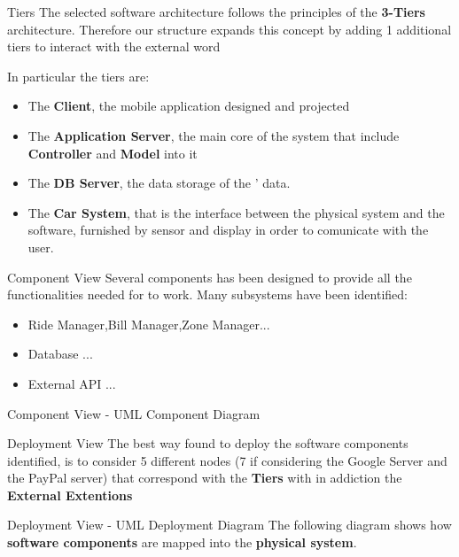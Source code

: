 \documentclass{../Common/Structure/pdf_presentation}
\begin{document}
	\begin{frame}{Tiers}
		The selected software architecture follows the principles of the \textbf{3-Tiers} architecture. Therefore our structure expands this concept by adding 1 additional tiers to interact with the external word\par
		In particular the tiers are:
		\begin{itemize}
			\item The \textbf{Client}, the mobile application designed and projected
			\item The \textbf{Application Server}, the main core of the system that include \textbf{Controller} and \textbf{Model} into it
			\item The \textbf{DB Server}, the data storage of the \PowerEnJoy{}' data.
			\item The \textbf{Car System}, that is the interface between the physical system and the software, furnished by sensor and display in order to comunicate with the user.
		\end{itemize}
	\end{frame}
	\begin{frame}{Component View}
		Several components has been designed to provide all the functionalities needed for \PowerEnJoy{} to work.
		Many subsystems have been identified:
		\begin{itemize}
			\item Ride Manager,Bill Manager,Zone Manager...
			\item Database ...
			\item External API ...
		\end{itemize}
	\end{frame}
	\begin{frame}{Component View - UML Component Diagram}
	\end{frame}
	\begin{frame}{Deployment View}
			The best way found to deploy the software components identified, is to consider 5 different nodes (7 if considering the Google Server and the
			PayPal server) that correspond with the \textbf{Tiers} with in addiction the \textbf{External Extentions}
	\end{frame}
	\begin{frame}{Deployment View - UML Deployment Diagram}
		The following diagram shows how \textbf{software components} are mapped into the \textbf{physical system}.
	\end{frame}
\end{document}
